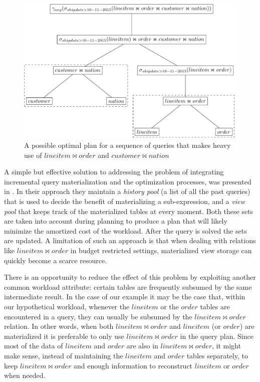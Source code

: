 \begin{figure}[H]
  \centering
  \includegraphics[width=.9\linewidth]{./imgs/workplan.pdf}
  \caption{\label{fig:workplan}A possible optimal plan for a sequence
    of queries that makes heavy use of \(lineitem \Join order\) and
    \(customer \Join nation\)}
\end{figure}

A simple but effective solution to addressing the problem of
integrating incremental query materialization and the optimization
processes, was presented in
\cite{perezHistoryawareQueryOptimization}. In their approach they
maintain a \emph{history pool} (a list of all the past queries) that is
used to decide the benefit of materializing a sub-expression, and a
\emph{view pool} that keeps track of the materialized tables at every
moment. Both these sets are taken into account during planning to
produce a plan that will likely minimize the amortized cost of the
workload. After the query is solved the sets are updated. A limitation
of such an approach is that when dealing with relations like
\(lineitem \Join order\) in budget restricted settings, materialized
view storage can quickly become a scarce resource.

There is an opportunity to reduce the effect of this problem by
exploiting another common workload attribute: certain tables are
frequently subsumed by the same intermediate result. In the case of
our example it may be the case that, within our hypothetical workload,
whenever the \(lineitem\) or the \(order\) tables are encountered in a
query, they can usually be subsumed by the \(lineitem \Join order\)
relation. In other words, when both \(lineitem \Join order\) and
\(lineitem\) (or \(order\)) are materialized it is preferable to only use
\(lineitem \Join order\) in the query plan. Since most of the data of
\(lineitem\) and \(order\) are also in \(lineitem \Join order\), it might
make sense, instead of maintaining the \(lineitem\) and \(order\) tables
separately, to keep \(lineitem \Join order\) and enough information to
reconstruct \(lineitem\) or \(order\) when needed.

